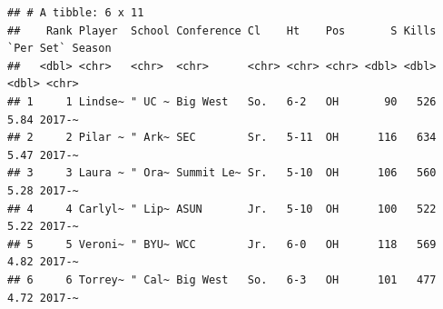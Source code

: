 \documentclass[
]{book}
\newenvironment{Shaded}{\begin{snugshade}}{\end{snugshade}}
\newcommand{\CharTok}[1]{\textcolor[rgb]{0.31,0.60,0.02}{#1}}
\newcommand{\DataTypeTok}[1]{\textcolor[rgb]{0.13,0.29,0.53}{#1}}
\newcommand{\KeywordTok}[1]{\textcolor[rgb]{0.13,0.29,0.53}{\textbf{#1}}}
\newcommand{\NormalTok}[1]{#1}
\newcommand{\OperatorTok}[1]{\textcolor[rgb]{0.81,0.36,0.00}{\textbf{#1}}}
\newcommand{\OtherTok}[1]{\textcolor[rgb]{0.56,0.35,0.01}{#1}}
\newcommand{\StringTok}[1]{\textcolor[rgb]{0.31,0.60,0.02}{#1}}
\begin{document}
\begin{Shaded}
\end{Shaded}

\begin{verbatim}
## # A tibble: 6 x 11
##    Rank Player  School Conference Cl    Ht    Pos       S Kills `Per Set` Season
##   <dbl> <chr>   <chr>  <chr>      <chr> <chr> <chr> <dbl> <dbl>     <dbl> <chr> 
## 1     1 Lindse~ " UC ~ Big West   So.   6-2   OH       90   526      5.84 2017-~
## 2     2 Pilar ~ " Ark~ SEC        Sr.   5-11  OH      116   634      5.47 2017-~
## 3     3 Laura ~ " Ora~ Summit Le~ Sr.   5-10  OH      106   560      5.28 2017-~
## 4     4 Carlyl~ " Lip~ ASUN       Jr.   5-10  OH      100   522      5.22 2017-~
## 5     5 Veroni~ " BYU~ WCC        Jr.   6-0   OH      118   569      4.82 2017-~
## 6     6 Torrey~ " Cal~ Big West   So.   6-3   OH      101   477      4.72 2017-~
\end{verbatim}
\end{document}
